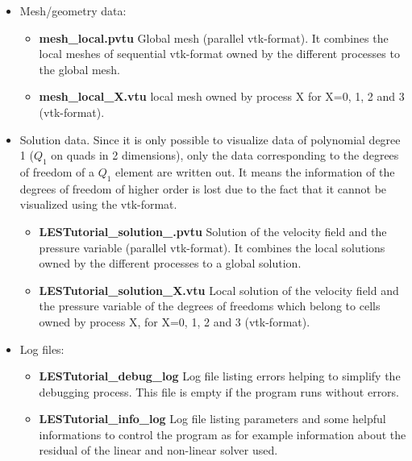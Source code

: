 \documentclass[a4paper, 11pt, twoside]{article}
\begin{document}
\begin{itemize}
\item Mesh/geometry data:
\begin{itemize}
\item \textbf{mesh\_local.pvtu} Global mesh (parallel vtk-format). It combines the local meshes of sequential vtk-format owned by the different processes to the global mesh.
\item \textbf{mesh\_local\_X.vtu} local mesh owned by process X for X=0, 1, 2 and 3 (vtk-format).
\end{itemize}

\item Solution data. Since it is only possible to visualize data of polynomial degree 1 ($Q_1$ on quads in 2 dimensions), 
only the data corresponding to the degrees of freedom of a $Q_1$ element are written out. 
It means the information of the degrees of freedom of higher order is lost due to the fact that it cannot be visualized using the vtk-format.

\begin{itemize}
\item \textbf{LESTutorial\_solution\_.pvtu} Solution of the velocity field and the pressure variable (parallel vtk-format). It combines the local solutions owned by the different processes to a global solution.
\item \textbf{LESTutorial\_solution\_X.vtu} Local solution of the velocity field and the pressure variable of the degrees of freedoms which belong to cells owned by process X, for X=0, 1, 2 and 3 (vtk-format).
\end{itemize}
\item Log files:
\begin{itemize}
\item \textbf{LESTutorial\_debug\_log} Log file listing errors helping to simplify the debugging process. This file is empty if the program runs without errors.
\item \textbf{LESTutorial\_info\_log} Log file listing parameters and some helpful informations to control 
      the program as for example information about the residual of the linear and non-linear solver used.
\end{itemize}
\end{itemize}
\end{document}
